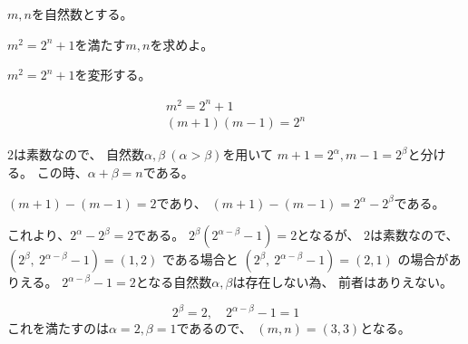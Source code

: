 \documentclass[12pt,b5paper]{ltjsarticle}
\begin{document}
\hrulefill

$m,n$を自然数とする。

$m^2=2^n+1$を満たす$m,n$を求めよ。

\hrulefill

$m^2=2^n+1$を変形する。

\begin{gather}
 m^2 = 2^n +1\\
 (m+1)(m-1) = 2^n
\end{gather}


$2$は素数なので、
自然数$\alpha,\beta\ (\alpha>\beta)$を用いて
$m+1=2^\alpha, m-1=2^\beta$と分ける。
この時、$\alpha + \beta = n$である。

$(m+1)-(m-1) = 2$であり、
$(m+1)-(m-1) = 2^\alpha - 2^\beta$である。

これより、$2^\alpha - 2^\beta =2$である。
$2^\beta (2^{\alpha-\beta}-1)=2$となるが、
$2$は素数なので、
$(2^\beta,\ 2^{\alpha-\beta}-1)=(1,2)$
である場合と
$(2^\beta,\ 2^{\alpha-\beta}-1)=(2,1)$
の場合がありえる。
$2^{\alpha-\beta}-1=2$となる自然数$\alpha,\beta$は存在しない為、
前者はありえない。

\begin{equation}
 2^\beta=2, \quad 2^{\alpha-\beta}-1=1
\end{equation}
これを満たすのは$\alpha=2,\beta=1$であるので、
$(m,n)=(3,3)$となる。
\end{document}
